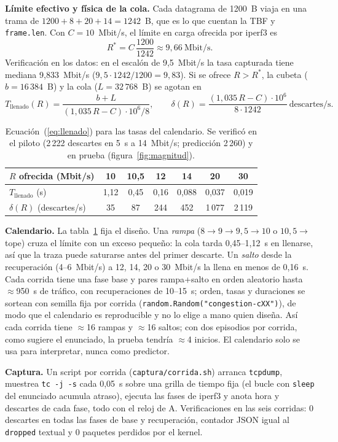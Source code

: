 \documentclass[11pt,a4paper]{article}
\begin{document}
\textbf{Límite efectivo y física de la cola.} Cada datagrama de 1200~B viaja en una trama de
$1200+8+20+14=1242$~B, que es lo que cuentan la TBF y \texttt{frame.len}. Con $C=10$~Mbit/s,
el límite en carga ofrecida por iperf3 es
\[
R^{*}=C\,\frac{1200}{1242}\approx 9{,}66\ \text{Mbit/s}.
\]
Verificación en los datos: en el escalón de 9,5~Mbit/s la tasa capturada tiene mediana
9,833~Mbit/s ($9{,}5\cdot1242/1200=9{,}83$). Si se ofrece $R>R^{*}$, la cubeta
($b=16\,384$~B) y la cola ($L=32\,768$~B) se agotan en
\begin{equation}
T_{\text{llenado}}(R)=\frac{b+L}{(1{,}035\,R-C)\cdot10^{6}/8},
\qquad
\delta(R)=\frac{(1{,}035\,R-C)\cdot10^{6}}{8\cdot1242}\ \text{descartes/s}.
\label{eq:llenado}
\end{equation}
\begin{table}[!htb]
\centering\small
\begin{tabular}{lcccccc}
\toprule
$R$ ofrecida (Mbit/s) & 10 & 10,5 & 12 & 14 & 20 & 30\\
\midrule
$T_{\text{llenado}}$ (s) & 1,12 & 0,45 & 0,16 & 0,088 & 0,037 & 0,019\\
$\delta(R)$ (descartes/s) & 35 & 87 & 244 & 452 & 1\,077 & 2\,119\\
\bottomrule
\end{tabular}
\caption{Ecuación~(\ref{eq:llenado}) para las tasas del calendario. Se verificó en el piloto (2\,222 descartes en 5~s a 14~Mbit/s; predicción 2\,260) y en prueba (figura~\ref{fig:magnitud}).}
\label{tab:llenado}
\end{table}

\textbf{Calendario.} La tabla~\ref{tab:llenado} fija el diseño. Una \emph{rampa}
($8\to9\to9{,}5\to10$ o $10{,}5\to$ tope) cruza el límite con un exceso pequeño: la cola
tarda 0,45--1,12~s en llenarse, así que la traza puede saturarse antes del primer descarte.
Un \emph{salto} desde la recuperación (4--6~Mbit/s) a 12, 14, 20 o 30~Mbit/s la llena en
menos de 0,16~s. Cada corrida tiene una fase base y pares rampa+salto en orden aleatorio
hasta $\approx$950~s de tráfico, con recuperaciones de 10--15~s; orden, tasas y duraciones se
sortean con semilla fija por corrida (\texttt{random.Random("congestion-cXX")}), de modo
que el calendario es reproducible y no lo elige a mano quien diseña. Así cada corrida
tiene $\approx$16 rampas y $\approx$16 saltos; con dos episodios por corrida, como sugiere el
enunciado, la prueba tendría $\approx$4 inicios. El calendario solo se usa para interpretar,
nunca como predictor.

\textbf{Captura.} Un script por corrida (\texttt{captura/corrida.sh}) arranca
\texttt{tcpdump}, muestrea \texttt{tc -j -s} cada 0,05~s sobre una grilla de tiempo fija
(el bucle con \texttt{sleep} del enunciado acumula atraso), ejecuta las fases de iperf3 y
anota hora y descartes de cada fase, todo con el reloj de A. Verificaciones en las seis
corridas: 0 descartes en todas las fases de base y recuperación, contador JSON igual al
\texttt{dropped} textual y 0 paquetes perdidos por el kernel.
\end{document}
